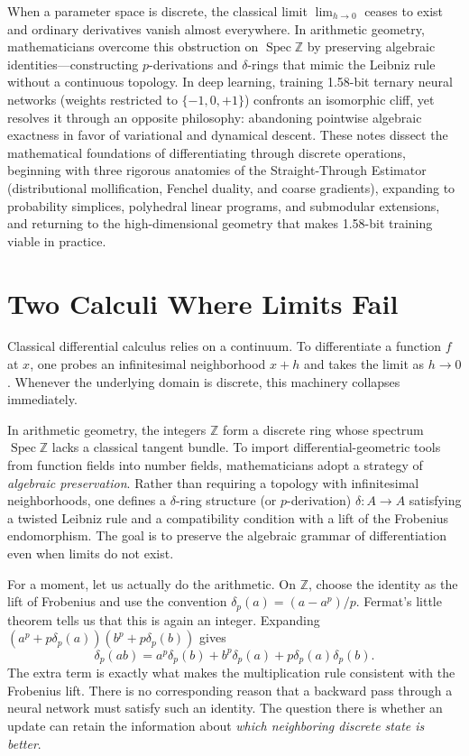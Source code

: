 
When a parameter space is discrete, the classical limit $\lim_{h \to 0}$ ceases to exist and ordinary derivatives vanish almost everywhere. In arithmetic geometry, mathematicians overcome this obstruction on $\operatorname{Spec} \mathbb{Z}$ by preserving algebraic identities—constructing $p$-derivations and $\delta$-rings that mimic the Leibniz rule without a continuous topology. In deep learning, training 1.58-bit ternary neural networks (weights restricted to $\{-1, 0, +1\}$) confronts an isomorphic cliff, yet resolves it through an opposite philosophy: abandoning pointwise algebraic exactness in favor of variational and dynamical descent. These notes dissect the mathematical foundations of differentiating through discrete operations, beginning with three rigorous anatomies of the Straight-Through Estimator (distributional mollification, Fenchel duality, and coarse gradients), expanding to probability simplices, polyhedral linear programs, and submodular extensions, and returning to the high-dimensional geometry that makes 1.58-bit training viable in practice.

\section{Two Calculi Where Limits Fail}

Classical differential calculus relies on a continuum. To differentiate a function $f$ at $x$, one probes an infinitesimal neighborhood $x + h$ and takes the limit as $h \to 0$. Whenever the underlying domain is discrete, this machinery collapses immediately.

In arithmetic geometry, the integers $\mathbb{Z}$ form a discrete ring whose spectrum $\operatorname{Spec}\mathbb{Z}$ lacks a classical tangent bundle. To import differential-geometric tools from function fields into number fields, mathematicians adopt a strategy of \emph{algebraic preservation}. Rather than requiring a topology with infinitesimal neighborhoods, one defines a $\delta$-ring structure (or $p$-derivation) $\delta: A \to A$ satisfying a twisted Leibniz rule and a compatibility condition with a lift of the Frobenius endomorphism. The goal is to preserve the algebraic grammar of differentiation even when limits do not exist.

For a moment, let us actually do the arithmetic. On $\mathbb Z$, choose the identity as the lift of Frobenius and use the convention $\delta_p(a)=(a-a^p)/p$. Fermat's little theorem tells us that this is again an integer. Expanding $(a^p+p\delta_p(a))(b^p+p\delta_p(b))$ gives
\[
 \delta_p(ab)=a^p\delta_p(b)+b^p\delta_p(a)
                  +p\delta_p(a)\delta_p(b).
\]
The extra term is exactly what makes the multiplication rule consistent with the Frobenius lift. There is no corresponding reason that a backward pass through a neural network must satisfy such an identity. The question there is whether an update can retain the information about \emph{which neighboring discrete state is better}.

